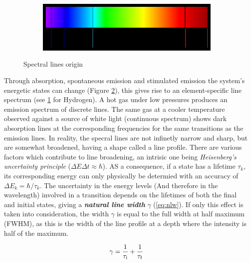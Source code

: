 \begin{figure}[ht]
\begin{subfigure}[t]{0.3\textwidth}
	\end{subfigure}\hfill%
	\begin{subfigure}[c]{1.0\textwidth}
		\includegraphics[width=\textwidth]{img/hydrogen-spectra}
		\label{fig:hydrogen-spectra}
	\end{subfigure}
\caption{Spectral lines origin}
\label{fig:spectra}
\end{figure}%

Through absorption, spontaneous emission and stimulated emission the system's energetic states can change (Figure \ref{fig:spectra}), this gives rise to an element-specific line spectrum (see \ref{fig:hydrogen-spectra} for Hydrogen). A hot gas under low pressures produces an emission spectrum of discrete lines. The same gas at a cooler temperature observed against a source of white light (continuous spectrum) shows dark absorption lines at the corresponding frequencies for the same transitions as the emission lines\citep{Karttunen2017}. In reality, the specral lines are not infinetly narrow and sharp, but are somewhat broadened, having a shape called a line profile. There are various factors which contribute to line broadening, an intrisic one being \textit{Heisenberg's uncertainty principle} ($\Delta E \Delta t \approx \hbar$). AS a consequence, if a state has a lifetime $\tau_k$, its corresponding energy can only physically be determied with an accuracy of $\Delta E_k = \hbar/\tau_k$. The uncertainty in the energy levels (And therefore in the wavelength) involved in a transition depends on the lifetimes of both the final and initial states, giving a \textbf{\textit{natural line width}} $\gamma$ (\ref{eq:nlw}). If only this effect is taken into consideration, the width $\gamma$ is equal to the full width at half maximum (FWHM), as this is the width of the line profile at a depth where the intensity is half of the maximum. 

\begin{equation}\label{eq:nlw}
	\gamma = \frac{1}{\tau_{\rm{i}}} + \frac{1}{\tau_{\rm{f}}}
\end{equation}

